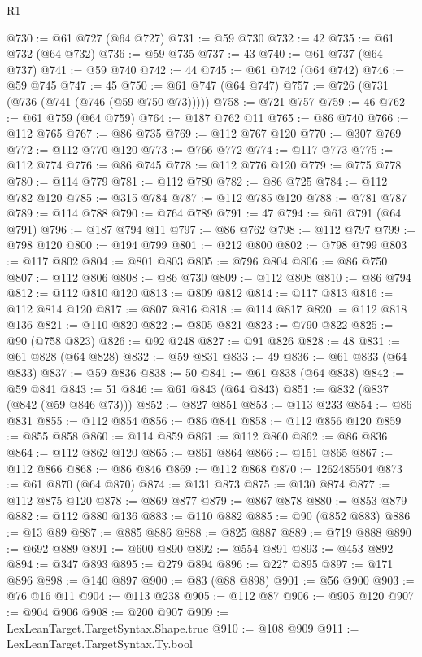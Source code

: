 \begin{lexlean}{R1}
\begin{coremodule}
@730 := @61 @727 (@64 @727)
@731 := @59 @730
@732 := 42
@735 := @61 @732 (@64 @732)
@736 := @59 @735
@737 := 43
@740 := @61 @737 (@64 @737)
@741 := @59 @740
@742 := 44
@745 := @61 @742 (@64 @742)
@746 := @59 @745
@747 := 45
@750 := @61 @747 (@64 @747)
@757 := @726 (@731 (@736 (@741 (@746 (@59 @750 @73)))))
@758 := @721 @757
@759 := 46
@762 := @61 @759 (@64 @759)
@764 := @187 @762 @11
@765 := @86 @740
@766 := @112 @765
@767 := @86 @735
@769 := @112 @767 @120
@770 := @307 @769
@772 := @112 @770 @120
@773 := @766 @772
@774 := @117 @773
@775 := @112 @774
@776 := @86 @745
@778 := @112 @776 @120
@779 := @775 @778
@780 := @114 @779
@781 := @112 @780
@782 := @86 @725
@784 := @112 @782 @120
@785 := @315 @784
@787 := @112 @785 @120
@788 := @781 @787
@789 := @114 @788
@790 := @764 @789
@791 := 47
@794 := @61 @791 (@64 @791)
@796 := @187 @794 @11
@797 := @86 @762
@798 := @112 @797
@799 := @798 @120
@800 := @194 @799
@801 := @212 @800
@802 := @798 @799
@803 := @117 @802
@804 := @801 @803
@805 := @796 @804
@806 := @86 @750
@807 := @112 @806
@808 := @86 @730
@809 := @112 @808
@810 := @86 @794
@812 := @112 @810 @120
@813 := @809 @812
@814 := @117 @813
@816 := @112 @814 @120
@817 := @807 @816
@818 := @114 @817
@820 := @112 @818 @136
@821 := @110 @820
@822 := @805 @821
@823 := @790 @822
@825 := @90 (@758 @823)
@826 := @92 @248
@827 := @91 @826
@828 := 48
@831 := @61 @828 (@64 @828)
@832 := @59 @831
@833 := 49
@836 := @61 @833 (@64 @833)
@837 := @59 @836
@838 := 50
@841 := @61 @838 (@64 @838)
@842 := @59 @841
@843 := 51
@846 := @61 @843 (@64 @843)
@851 := @832 (@837 (@842 (@59 @846 @73)))
@852 := @827 @851
@853 := @113 @233
@854 := @86 @831
@855 := @112 @854
@856 := @86 @841
@858 := @112 @856 @120
@859 := @855 @858
@860 := @114 @859
@861 := @112 @860
@862 := @86 @836
@864 := @112 @862 @120
@865 := @861 @864
@866 := @151 @865
@867 := @112 @866
@868 := @86 @846
@869 := @112 @868
@870 := 1262485504
@873 := @61 @870 (@64 @870)
@874 := @131 @873
@875 := @130 @874
@877 := @112 @875 @120
@878 := @869 @877
@879 := @867 @878
@880 := @853 @879
@882 := @112 @880 @136
@883 := @110 @882
@885 := @90 (@852 @883)
@886 := @13 @89
@887 := @885 @886
@888 := @825 @887
@889 := @719 @888
@890 := @692 @889
@891 := @600 @890
@892 := @554 @891
@893 := @453 @892
@894 := @347 @893
@895 := @279 @894
@896 := @227 @895
@897 := @171 @896
@898 := @140 @897
@900 := @83 (@88 @898)
@901 := @56 @900
@903 := @76 @16 @11
@904 := @113 @238
@905 := @112 @87
@906 := @905 @120
@907 := @904 @906
@908 := @200 @907
@909 := LexLeanTarget.TargetSyntax.Shape.true
@910 := @108 @909
@911 := LexLeanTarget.TargetSyntax.Ty.bool

\end{coremodule}
\end{lexlean}

